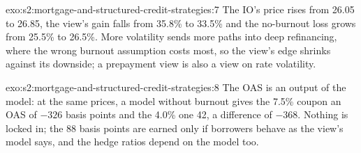\begin{solution}{exo:s2:mortgage-and-structured-credit-strategies:7}
The IO's price rises from 26.05 to 26.85, the view's gain falls from 35.8\% to 33.5\% and the no-burnout loss grows from 25.5\% to 26.5\%. More
volatility sends more paths into deep refinancing, where the wrong burnout assumption costs most, so the view's edge shrinks against its downside;
a prepayment view is also a view on rate volatility.
\end{solution}

\begin{solution}{exo:s2:mortgage-and-structured-credit-strategies:8}
The OAS is an output of the model: at the same prices, a model without burnout gives the 7.5\% coupon an OAS of $-326$ basis points and the 4.0\% one
42, a difference of $-368$. Nothing is locked in; the 88 basis points are earned only if borrowers behave as the view's model says, and the hedge
ratios depend on the model too.
\end{solution}

